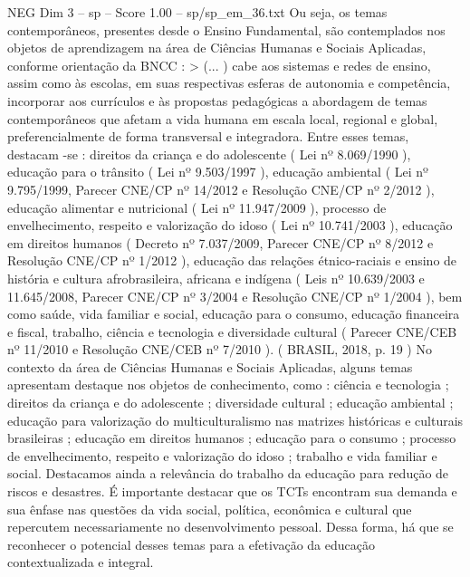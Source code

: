 \begin{textsample}{NEG Dim 3 – sp – Score 1.00 – sp/sp\_em\_36.txt}
Ou seja, os temas contemporâneos, presentes desde o Ensino Fundamental, são contemplados nos objetos de aprendizagem na área de Ciências Humanas e Sociais Aplicadas, conforme orientação da BNCC : > (... ) cabe aos sistemas e redes de ensino, assim como às escolas, em suas respectivas esferas de autonomia e competência, incorporar aos currículos e às propostas pedagógicas a abordagem de temas contemporâneos que afetam a vida humana em escala local, regional e global, preferencialmente de forma transversal e integradora.
Entre esses temas, destacam -se : direitos da criança e do adolescente ( Lei nº 8.069/1990 ), educação para o trânsito ( Lei nº 9.503/1997 ), educação ambiental ( Lei nº 9.795/1999, Parecer CNE/CP nº 14/2012 e Resolução CNE/CP nº 2/2012 ), educação alimentar e nutricional ( Lei nº 11.947/2009 ), processo de envelhecimento, respeito e valorização do idoso ( Lei nº 10.741/2003 ), educação em direitos humanos ( Decreto nº 7.037/2009, Parecer CNE/CP nº 8/2012 e Resolução CNE/CP nº 1/2012 ), educação das relações étnico-raciais e ensino de história e cultura afrobrasileira, africana e indígena ( Leis nº 10.639/2003 e 11.645/2008, Parecer CNE/CP nº 3/2004 e Resolução CNE/CP nº 1/2004 ), bem como saúde, vida familiar e social, educação para o consumo, educação financeira e fiscal, trabalho, ciência e tecnologia e diversidade cultural ( Parecer CNE/CEB nº 11/2010 e Resolução CNE/CEB nº 7/2010 ). ( BRASIL, 2018, p. 19 ) No contexto da área de Ciências Humanas e Sociais Aplicadas, alguns temas apresentam destaque nos objetos de conhecimento, como : ciência e tecnologia ; direitos da criança e do adolescente ; diversidade cultural ; educação ambiental ; educação para valorização do multiculturalismo nas matrizes históricas e culturais brasileiras ; educação em direitos humanos ; educação para o consumo ; processo de envelhecimento, respeito e valorização do idoso ; trabalho e vida familiar e social.
Destacamos ainda a relevância do trabalho da educação para redução de riscos e desastres.
É importante destacar que os TCTs encontram sua demanda e sua ênfase nas questões da vida social, política, econômica e cultural que repercutem necessariamente no desenvolvimento pessoal.
Dessa forma, há que se reconhecer o potencial desses temas para a efetivação da educação contextualizada e integral.

\end{textsample}
